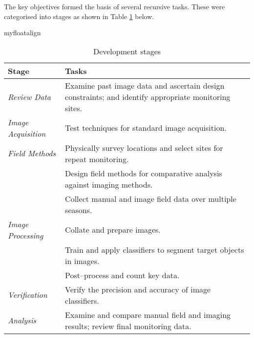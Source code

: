 The key objectives formed the basis of several recursive tasks. These were categorised into stages as shown in Table \ref{tab:rd} below.

\begin{table}[!htbp]{myfloatalign}\caption[Development stages]{Development stages}\label{tab:rd} 
\begin{tabular}{p{1.2in}p{3.1in}}\toprule
Stage & Tasks \\ \midrule
\emph{Review Data} & Examine past image data and ascertain design constraints; and identify appropriate monitoring sites. \\
\emph{Image Acquisition} & Test techniques for standard image acquisition. \\
\emph{Field Methods} & Physically survey locations and select sites for repeat monitoring.\\ & Design field methods for comparative analysis against imaging methods.\\ & Collect manual and image field data over multiple seasons. \\ 
\emph{Image Processing} & Collate and prepare images. \\ & Train and apply classifiers to segment target objects in images. \\ &
Post--process and count key data. \\
\emph{Verification} & Verify the precision and accuracy of image classifiers. \\ 
\emph{Analysis} & Examine and compare manual field and imaging results; review final monitoring data. \\ \bottomrule
\end{tabular}
\end{table}


